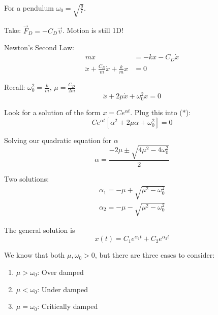 \documentclass[twoside]{scrartcl}
\begin{document}
For a pendulum $\omega_0 = \sqrt{\frac{g}{l}}$. 



\begin{center}
\end{center}

Take: $\vec{F}_D = -C_D\vec{v}$. Motion is still 1D! 

Newton's Second Law:
\[
\begin{aligned}
  m\ddot{x} &= -kx -C_D\dot{x}\\
  \ddot{x} + \frac{C_D}{m}\dot{x} + \frac{k}{m}x &= 0
\end{aligned}
\]

Recall: $\omega_0^2 = \frac{k}{m}$, $\mu= \frac{C_D}{2m}$
\[\ddot{x} + 2\mu\dot{x} + \omega_0^2x = 0 \tag{$*$}\]

Look for a solution of the form $x = Ce^{\alpha t}$. Plug this into ($*$):
\[Ce^{\alpha t}[\alpha^2 + 2\mu\alpha + \omega_0^2] = 0\]

Solving our quadratic equation for $\alpha$
\[\alpha = \frac{-2\mu \pm \sqrt{4\mu^2 -4\omega_0^2}}{2}\]

Two solutions:
\[
\begin{aligned}
  \alpha_1 = -\mu + \sqrt{\mu^2 -\omega_0^2}\\
  \alpha_2 = -\mu -\sqrt{\mu^2 -\omega_0^2}
\end{aligned}
\]

The general solution is
\[x(t) = C_1e^{\alpha_1t} + C_2e^{\alpha_2t}\]

We know that both $\mu, \omega_0 >0$, but there are three cases to consider:

\begin{enumerate}
  \item $\mu > \omega_0$: Over damped
  \item $\mu < \omega_0$: Under damped
  \item $\mu = \omega_0$: Critically damped
\end{enumerate}~
\end{document}
